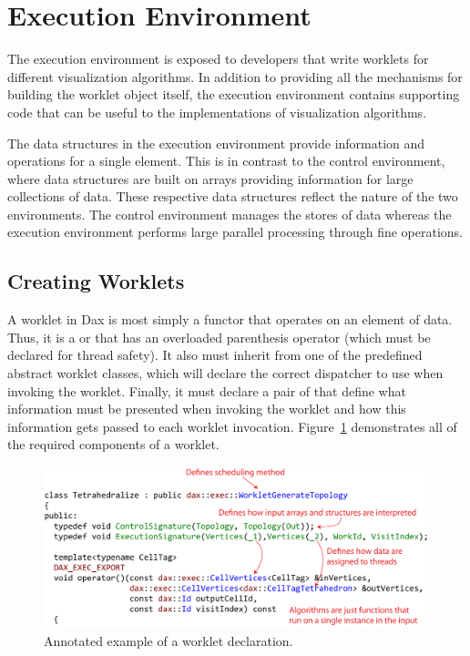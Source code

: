 


\section{Execution Environment}
\label{sec:ExecutionEnvironment}


The execution environment is exposed to developers that write worklets for
different visualization algorithms. In addition to providing all the
mechanisms for building the worklet object itself, the execution
environment contains supporting code that can be useful to the
implementations of visualization algorithms.

The data structures in the execution environment provide information and
operations for a single element. This is in contrast to the control
environment, where data structures are built on arrays providing
information for large collections of data. These respective data structures
reflect the nature of the two environments. The control environment manages
the stores of data whereas the execution environment performs large
parallel processing through fine operations.

\subsection{Creating Worklets}
\label{sec:CreatingWorklets}


A worklet in Dax is most simply a functor that operates on an element of
data. Thus, it is a  or  that has an
overloaded parenthesis operator (which must be declared 
for thread safety). It also must inherit from one of the predefined
abstract worklet classes, which will declare the correct dispatcher to use
when invoking the worklet. Finally, it must declare a pair of
 that define what information must be
presented when invoking the worklet and how this information gets passed to
each worklet invocation. Figure~\ref{fig:WorkletExampleAnnotated}
demonstrates all of the required components of a worklet.

\begin{figure}[htb]
  \includegraphics[width=\linewidth]{images/WorkletExampleAnnotated}
  \caption{Annotated example of a worklet declaration.}
  \label{fig:WorkletExampleAnnotated}
\end{figure}

